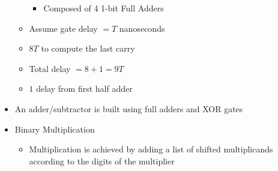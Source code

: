 \begin{itemize}
\begin{itemize}
        \begin{itemize}

          \item Composed of 4 1-bit Full Adders

        \end{itemize}

      \item Assume gate delay $=T$ nanoseconds

      \item 8$T$ to compute the last carry

      \item Total delay $=8+1=9T$

      \item $1$ delay from first half adder

    \end{itemize}

  \item An adder/subtractor is built using full adders and XOR gates

  \item Binary Multiplication

    \begin{itemize}

      \item Multiplication is achieved by adding a list of shifted multiplicands according to the digits of the multiplier

    \end{itemize}

\end{itemize}




